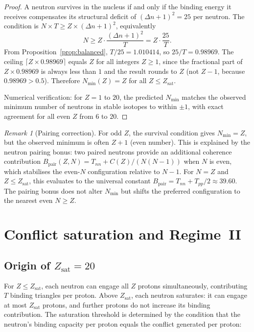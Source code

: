 \documentclass{article}
\theoremstyle{remark}
\newtheorem{remark}[theorem]{Remark}
\newcommand{\Tpp}{T_{pp}}
\newcommand{\Tnn}{T_{nn}}
\newcommand{\Zsat}{Z_{\mathrm{sat}}}
\newcommand{\Nmin}{N_{\min}}
\newcommand{\Deltanop}{\Delta n}
\newcommand{\Bpair}{B_{\mathrm{pair}}}
\begin{document}
\begin{proof}
A neutron survives in the nucleus if and only if the binding energy it receives compensates its structural deficit of $(\Deltanop+1)^2 = 25$ per neutron. The condition is $N \times T \geq Z \times (\Deltanop+1)^2$, equivalently
\begin{equation}
  N \geq Z \cdot \frac{(\Deltanop+1)^2}{T} = Z \cdot \frac{25}{T}.
  \label{eq:survival_condition}
\end{equation}
From Proposition~\ref{prop:balanced}, $T/25 = 1.010414$, so $25/T = 0.98969$. The ceiling $\lceil Z \times 0.98969 \rceil$ equals $Z$ for all integers $Z \geq 1$, since the fractional part of $Z \times 0.98969$ is always less than $1$ and the result rounds to $Z$ (not $Z-1$, because $0.98969 > 0.5$). Therefore $\Nmin(Z) = Z$ for all $Z \leq \Zsat$.

Numerical verification: for $Z = 1$ to $20$, the predicted $\Nmin$ matches the observed minimum number of neutrons in stable isotopes to within $\pm 1$, with exact agreement for all even $Z$ from $6$ to $20$.
\end{proof}

\begin{remark}[Pairing correction]
For odd $Z$, the survival condition gives $\Nmin = Z$, but the observed minimum is often $Z+1$ (even number). This is explained by the neutron pairing bonus: two paired neutrons provide an additional coherence contribution $\Bpair(Z,N) = \Tnn + C(Z)/(N(N-1))$ when $N$ is even, which stabilises the even-$N$ configuration relative to $N-1$. For $N = Z$ and $Z \leq \Zsat$, this evaluates to the universal constant $\Bpair = \Tnn + \Tpp/2 \approx 39.60$. The pairing bonus does not alter $\Nmin$ but shifts the preferred configuration to the nearest even $N \geq Z$.
\end{remark}

\section{Conflict saturation and Regime~II}
\label{sec:saturation}

\subsection{Origin of \texorpdfstring{$\Zsat = 20$}{Zsat = 20}}

For $Z \leq \Zsat$, each neutron can engage all $Z$ protons simultaneously, contributing $T$ binding triangles per proton. Above $\Zsat$, each neutron saturates: it can engage at most $\Zsat$ protons, and further protons do not increase its binding contribution. The saturation threshold is determined by the condition that the neutron's binding capacity per proton equals the conflict generated per proton:
\end{document}
